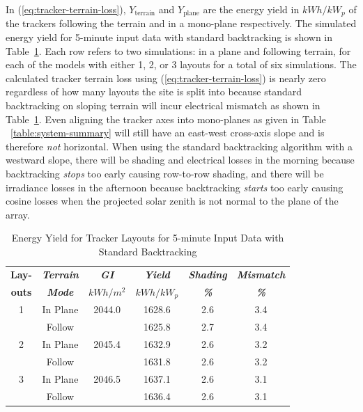 \documentclass[conference]{IEEEtran}
\begin{document}
In (\ref{eq:tracker-terrain-loss}), $Y_\text{terrain}$ and $Y_\text{plane}$ are the energy yield in $kWh/kW_p$ of the trackers following the terrain and in a mono-plane respectively. The simulated energy yield for 5-minute input data with standard backtracking is shown in Table~\ref{table:standard-5min}. Each row refers to two simulations: in a plane and following terrain, for each of the models with either 1, 2, or 3 layouts for a total of six simulations. The calculated tracker terrain loss using (\ref{eq:tracker-terrain-loss}) is nearly zero regardless of how many layouts the site is split into because standard backtracking on sloping terrain will incur electrical mismatch as shown in Table~\ref{table:standard-5min}. Even aligning the tracker axes into mono-planes as given in Table ~\ref{table:system-summary} will still have an east-west cross-axis slope and is therefore \textit{not} horizontal. When using the standard backtracking algorithm with a westward slope, there will be shading and electrical losses in the morning because backtracking \textit{stops} too early causing row-to-row shading, and there will be irradiance losses in the afternoon because backtracking \textit{starts} too early causing cosine losses when the projected solar zenith is not normal to the plane of the array.

\begin{table}[htbp]
\caption{Energy Yield for Tracker Layouts for 5-minute Input Data with Standard Backtracking}
\begin{center}
\begin{tabular}{|c|c|c|c|c|c|}
\hline
\textbf{Lay-}& \textbf{\textit{Terrain}}& \textbf{\textit{GI}}&        \textbf{\textit{Yield}}&        \textbf{\textit{Shading}}& \textbf{\textit{Mismatch}} \\
\textbf{outs}& \textbf{\textit{Mode}}&    \textbf{\textit{$kWh/m^2$}}& \textbf{\textit{$kWh / kW_p$}}& \textbf{\textit{\%}}&      \textbf{\textit{\%}} \\
\hline
1& In Plane& 2044.0&  1628.6& 2.6& 3.4 \\
 & Follow&         &  1625.8& 2.7& 3.4 \\
\hline
2& In Plane& 2045.4&  1632.9& 2.6& 3.2 \\
 & Follow&         &  1631.8& 2.6& 3.2 \\
\hline
3& In Plane& 2046.5&  1637.1& 2.6& 3.1 \\
 & Follow&         &  1636.4& 2.6& 3.1 \\
\hline
\end{tabular}
\label{table:standard-5min}
\end{center}
\end{table}
\end{document}
